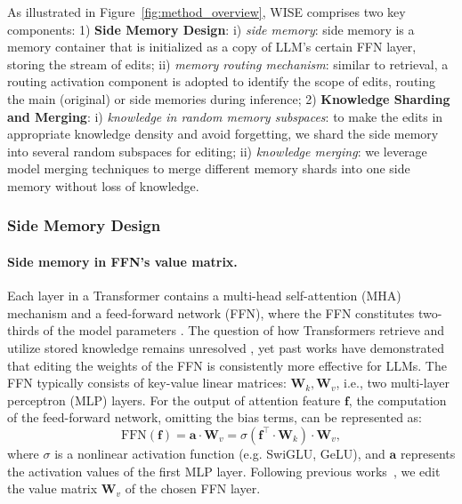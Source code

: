 \documentclass{article}
\begin{document}
As illustrated in Figure~\ref{fig:method_overview}, WISE comprises two key components: 
1) \textbf{Side Memory Design}: i) \textit{side memory}: side memory is a memory container that is initialized as a copy of LLM's certain FFN layer, storing the stream of edits; ii) \textit{memory routing mechanism}: similar to retrieval, a routing activation component is adopted to identify the scope of edits, routing the main (original) or side memories during inference; 
2) \textbf{Knowledge Sharding and Merging}: i) \textit{knowledge in random memory subspaces}: to make the edits in appropriate knowledge density and avoid forgetting, we shard the side memory into several random subspaces for editing; ii) \textit{knowledge merging}: we leverage model merging techniques to merge different memory shards into one side memory without loss of knowledge.

\subsubsection{Side Memory Design} \label{subsec:side_memory}
\paragraph{Side memory in FFN's value matrix.} 
Each layer in a Transformer contains a multi-head self-attention (MHA) mechanism and a feed-forward network (FFN), where the FFN constitutes two-thirds of the model parameters \cite{geva-etal-2021-transformer}.
The question of how Transformers retrieve and utilize stored knowledge remains unresolved \cite{rome, niu2024what}, yet past works \cite{mend, geva-etal-2021-transformer} have demonstrated that editing the weights of the FFN is consistently more effective for LLMs.
The FFN typically consists of key-value linear matrices: $\mathbf{W}_k, \mathbf{W}_v$, i.e., two multi-layer perceptron (MLP) layers.
For the output of attention feature $\mathbf{f}$, the computation of the feed-forward network, omitting the bias terms, can be represented as:
\begin{equation}
    \text{FFN}(\mathbf{f}) = \mathbf{a} \cdot \mathbf{W}_v = \sigma({\mathbf{f}}^\top \cdot \mathbf{W}_k) \cdot \mathbf{W}_v,
    \label{equ:ffn_function}
\end{equation}
where $\sigma$ is a nonlinear activation function (e.g. SwiGLU, GeLU), and $\mathbf{a}$ represents the activation values of the first MLP layer. 
Following previous works~\cite{rome,geva-etal-2021-transformer}, we edit the value matrix $\mathbf{W}_{v}$ of the chosen FFN layer. 
\end{document}
